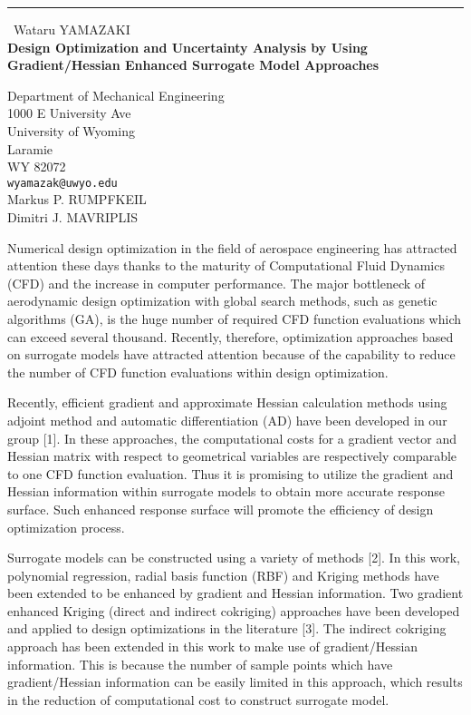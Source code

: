 \documentclass{report}
\begin{document}
\begin{center}
\rule{6in}{1pt} \
{\large Wataru YAMAZAKI \\
{\bf Design Optimization and Uncertainty Analysis by Using Gradient/Hessian Enhanced Surrogate Model Approaches}}

Department of Mechanical Engineering \\ 1000 E University Ave  \\ University of Wyoming \\ Laramie \\ WY 82072
\\
{\tt wyamazak@uwyo.edu}\\
Markus P. RUMPFKEIL\\
Dimitri J. MAVRIPLIS\end{center}

Numerical design optimization in the field of aerospace engineering has
attracted attention these days thanks to the maturity of Computational
Fluid Dynamics (CFD) and the increase in computer performance. The major
bottleneck of aerodynamic design optimization with global search methods,
such as genetic algorithms (GA), is the huge number of required CFD
function evaluations which can exceed several thousand. Recently,
therefore, optimization approaches based on surrogate models have
attracted attention because of the capability to reduce the number of CFD
function evaluations within design optimization.

Recently, efficient gradient and approximate Hessian calculation methods
using adjoint method and automatic differentiation (AD) have been
developed in our group [1]. In these approaches, the computational costs
for a gradient vector and Hessian matrix with respect to geometrical
variables are respectively comparable to one CFD function evaluation.
Thus it is promising to utilize the gradient and Hessian information
within surrogate models to obtain more accurate response surface. Such
enhanced response surface will promote the efficiency of design
optimization process.

Surrogate models can be constructed using a variety of methods [2]. In
this work, polynomial regression, radial basis function (RBF) and Kriging
methods have been extended to be enhanced by gradient and Hessian
information. Two gradient enhanced Kriging (direct and indirect
cokriging) approaches have been developed and applied to design
optimizations in the literature [3]. The indirect cokriging approach has
been extended in this work to make use of gradient/Hessian information.
This is because the number of sample points which have gradient/Hessian
information can be easily limited in this approach, which results in the
reduction of computational cost to construct surrogate model.
\end{document}
